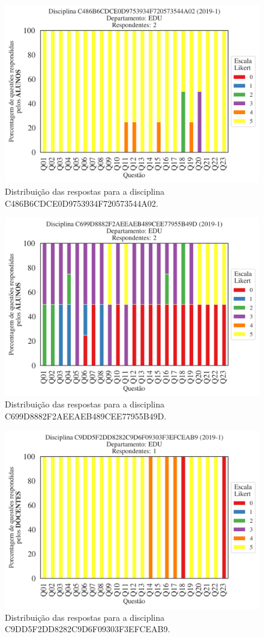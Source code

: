 \documentclass[a4paper,10pt]{article}
\begin{document}
\begin{figure}[h]
\centering
\includegraphics[width=0.485\linewidth]{analise_disciplina_departamento_EDU_ALUNO_TURMA_C486B6CDCE0D9753934F720573544A02.png}
\caption{\label{fig:analise_geral_departamento}                Distribuição das respostas para a disciplina C486B6CDCE0D9753934F720573544A02.}
\end{figure}
\begin{figure}[h]
\centering
\includegraphics[width=0.485\linewidth]{analise_disciplina_departamento_EDU_ALUNO_TURMA_C699D8882F2AEEAEB489CEE77955B49D.png}
\caption{\label{fig:analise_geral_departamento}                Distribuição das respostas para a disciplina C699D8882F2AEEAEB489CEE77955B49D.}
\end{figure}
\begin{figure}[h]
\centering
\includegraphics[width=0.485\linewidth]{analise_disciplina_departamento_EDU_DOCENTE_TURMA_C9DD5F2DD8282C9D6F09303F3EFCEAB9.png}
\caption{\label{fig:analise_geral_departamento}                Distribuição das respostas para a disciplina C9DD5F2DD8282C9D6F09303F3EFCEAB9.}
\end{figure}
\end{document}
